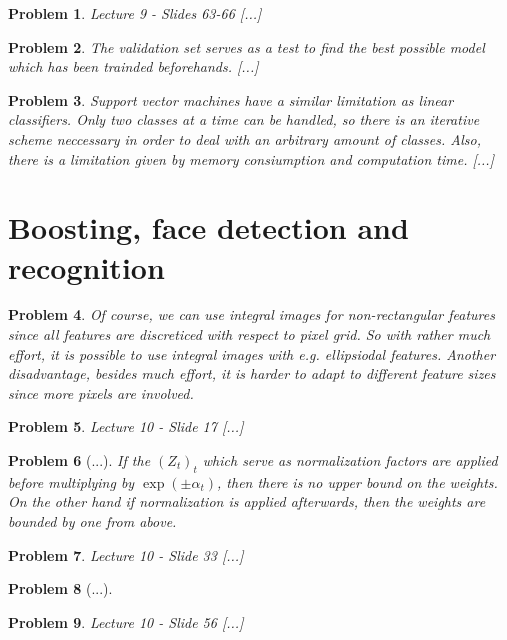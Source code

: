 \documentclass[12pt]{article}
\newtheorem{thm}{Problem}
\begin{document}
	\begin{thm}
		Lecture 9 - Slides 63-66 [...]
	\end{thm}

	\begin{thm}
		The validation set serves as a test to find the best possible model which has been trainded beforehands. [...]
	\end{thm}

	\begin{thm}
		Support vector machines have a similar limitation as linear classifiers. Only two classes at a time can be handled, so there is an iterative scheme neccessary in order to deal with an arbitrary amount of classes. Also, there is a limitation given by memory consiumption and computation time. [...]
	\end{thm}


	\section*{Boosting, face detection and recognition}
	
	\begin{thm}
		Of course, we can use integral images for non-rectangular features since all features are discreticed with respect to pixel grid. So with rather much effort, it is possible to use integral images with e.g. ellipsiodal features. Another disadvantage, besides much effort, it is harder to adapt to different feature sizes since more pixels are involved.
	\end{thm}

	\begin{thm}
		Lecture 10 - Slide 17 [...]
	\end{thm}

	\begin{thm}
		[...] If the $(Z_t)_t$ which serve as normalization factors are applied before multiplying by $\exp(\pm\alpha_t)$, then there is no upper bound on the weights. On the other hand if normalization is applied afterwards, then the weights are bounded by one from above.
	\end{thm}

	\begin{thm}
		Lecture 10 - Slide 33 [...]
	\end{thm}

	\begin{thm}
		[...]
	\end{thm}

	\begin{thm}
		Lecture 10 - Slide 56 [...]
	\end{thm}
	
%	
%	
\end{document}
